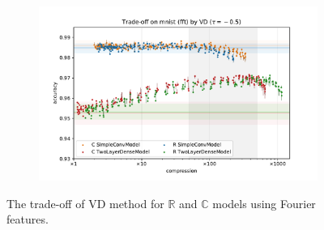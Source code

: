 \documentclass[a4paper,10pt]{article}
\newcommand{\real}{\mathbb{R}}
\newcommand{\cplx}{\mathbb{C}}
\begin{document}
\begin{figure}[b]
\begin{subfigure}[b]{0.5\textwidth}
  \end{subfigure}%
  \begin{subfigure}[b]{0.5\textwidth}
    \centering
    \includegraphics[width=\linewidth]{figure__mnist-like__trade-off/appendix__VD__mnist__fft__-0.5.pdf}
  \end{subfigure}
  \caption{%
    The trade-off of VD method for $\real$ and $\cplx$ models using Fourier features.
  }
  \label{fig:appendix__mnist-like__trade-off__VD__fft}
\end{figure}
\end{document}
